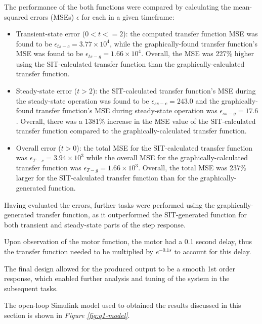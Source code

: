 \documentclass[11pt, onecolumn]{article}
\begin{document}
\par The performance of the both functions were compared by calculating the mean-squared errors (MSEs) $\epsilon$ for each in a given timeframe:
\begin{itemize}
    \item Transient-state error ($0 < t <= 2$): the computed transfer function MSE was found to be $\epsilon_{ts-c} = 3.77 \times 10^4$, while the graphically-found transfer function's MSE was found to be $\epsilon_{ts-g} = 1.66 \times 10^4$. Overall, the MSE was 227\% higher using the SIT-calculated transfer function than the graphically-calculated transfer function.
    \item Steady-state error ($t > 2$): the SIT-calculated transfer function's MSE during the steady-state operation was found to be $\epsilon_{ss-c} = 243.0$ and the graphically-found transfer function's MSE during steady-state operation was $\epsilon_{ss-g} = 17.6$. Overall, there was a 1381\% increase in the MSE value of the SIT-calculated transfer function compared to the graphically-calculated transfer function.
    \item Overall error ($t > 0$): the total MSE for the SIT-calculated transfer function was $\epsilon_{T-c}=3.94\times10^{3}$ while the overall MSE for the graphically-calculated transfer function was $\epsilon_{T-g}=1.66\times10^{3}$. Overall, the total MSE was 237\% larger for the SIT-calculated transfer function than for the graphically-generated function.
\end{itemize}
\par Having evaluated the errors, further tasks were performed using the graphically-generated transfer function, as it outperformed the SIT-generated function for both transient and steady-state parts of the step response.
\par Upon observation of the motor function, the motor had a 0.1 second delay, thus the transfer function needed to be multiplied by $e^{-0.1s}$ to account for this delay.
\par The final design allowed for the produced output to be a smooth 1st order response, which enabled further analysis and tuning of the system in the subsequent tasks.
\par The open-loop Simulink model used to obtained the results discussed in this section is shown in \textit{Figure \ref{fig:q1-model}}.\\
\end{document}
